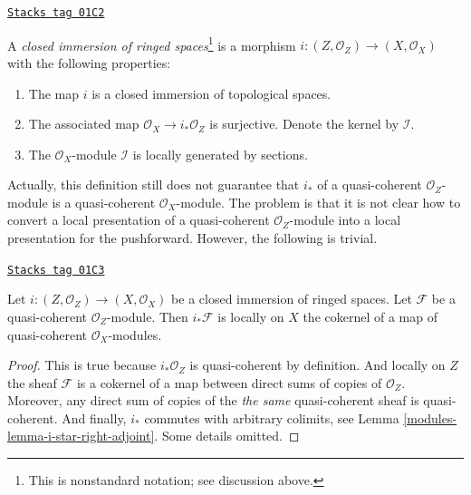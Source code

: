 \begin{definition}
\label{modules-definition-closed-immersion}
\href{https://stacks.math.columbia.edu/tag/01C2}{\texttt{Stacks tag 01C2}}

A {\it closed immersion of ringed spaces}\footnote{This is
nonstandard notation; see discussion above.} is a morphism
$i : (Z, \mathcal{O}_Z) \to (X, \mathcal{O}_X)$
with the following properties:
\begin{enumerate}
\item The map $i$ is a closed immersion of topological spaces.
\item The associated map $\mathcal{O}_X \to i_*\mathcal{O}_Z$
is surjective. Denote the kernel by $\mathcal{I}$.
\item The $\mathcal{O}_X$-module $\mathcal{I}$ is locally
generated by sections.
\end{enumerate}
\end{definition}

Actually, this definition still does not guarantee that
$i_*$ of a quasi-coherent $\mathcal{O}_Z$-module is a
quasi-coherent $\mathcal{O}_X$-module. The problem is that
it is not clear how to convert a local presentation of
a quasi-coherent $\mathcal{O}_Z$-module into a local
presentation for the pushforward. However, the following
is trivial.

\begin{lemma}
\label{modules-lemma-i-star-quasi-coherent}
\href{https://stacks.math.columbia.edu/tag/01C3}{\texttt{Stacks tag 01C3}}

Let $i : (Z, \mathcal{O}_Z) \to (X, \mathcal{O}_X)$
be a closed immersion of ringed spaces.
Let $\mathcal{F}$ be a quasi-coherent $\mathcal{O}_Z$-module.
Then $i_*\mathcal{F}$ is locally on $X$ the cokernel of
a map of quasi-coherent $\mathcal{O}_X$-modules.
\end{lemma}

\begin{proof}

This is true because $i_*\mathcal{O}_Z$ is quasi-coherent
by definition. And locally on $Z$ the sheaf $\mathcal{F}$
is a cokernel of a map between direct sums of copies
of $\mathcal{O}_Z$. Moreover, any direct sum of copies of the
{\it the same} quasi-coherent sheaf is quasi-coherent.
And finally, $i_*$ commutes with arbitrary colimits,
see Lemma \ref{modules-lemma-i-star-right-adjoint}. Some details omitted.
\end{proof}

